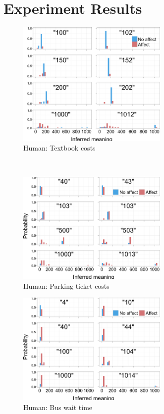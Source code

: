 \documentclass{article} %
\begin{document}
\section{Experiment Results}
\qquad
\begin{figure}[h]
	\centering
	\includegraphics[width=0.65\textwidth]{humans_textbook_all.png}
	\caption{Human: Textbook costs}
\end{figure}
\qquad
\\
\begin{figure}[h]
	\centering
	\includegraphics[width=0.65\textwidth]{humans_ticket_all.png}
	\caption{Human: Parking ticket costs}
\end{figure}

\begin{figure}[t]
	\centering
	\includegraphics[width=0.65\textwidth]{humans_bus_all.png}
	\caption{Human: Bus wait time}
\end{figure}
\end{document}
